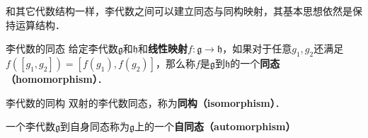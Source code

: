 

和其它代数结构一样，李代数之间可以建立同态与同构映射，其基本思想依然是保持运算结构．

\begin{definition}{李代数的同态}
给定李代数$\mathfrak{g}$和$\mathfrak{h}$和\textbf{线性映射}$f:\mathfrak{g}\to\mathfrak{h}$，如果对于任意$g_1, g_2$还满足$f([g_1, g_2])=[f(g_1), f(g_2)]$，那么称$f$是$\mathfrak{g}$到$\mathfrak{h}$的一个\textbf{同态（homomorphism）}．
\end{definition}

\begin{definition}{李代数的同构}
双射的李代数同态，称为\textbf{同构（isomorphism）}．
\end{definition}

一个李代数$\mathfrak{g}$到自身同态称为$\mathfrak{g}$上的一个\textbf{自同态（automorphism）}











